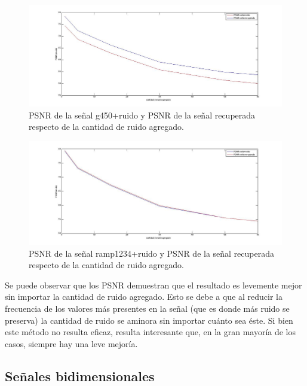 \documentclass[10pt, a4paper]{article}
\begin{document}
\begin{itemize}
\begin{figure}[H] %
\begin{center}
\includegraphics[width=550pt]{./psnr_g450_f2.jpg}
\caption[h]{PSNR de la señal g450+ruido y PSNR de la señal recuperada respecto de la cantidad de ruido agregado.}
\end{center}
\end{figure}

\begin{figure}[H] %
\begin{center}
\includegraphics[width=550pt]{./psnr_ramp1234_f2.jpg}
\caption[h]{PSNR de la señal ramp1234+ruido y PSNR de la señal recuperada respecto de la cantidad de ruido agregado.}
\end{center}
\end{figure}

Se puede observar que los PSNR demuestran que el resultado es levemente mejor sin importar la cantidad de ruido agregado. Esto se debe a que al reducir la frecuencia de los valores más presentes en la señal (que es donde más ruido se preserva) la cantidad de ruido se aminora sin importar cuánto sea éste. Si bien este método no resulta eficaz, resulta interesante que, en la gran mayoría de los casos, siempre hay una leve mejoría.

\subsection{Señales bidimensionales}


\end{itemize}
\end{document}
